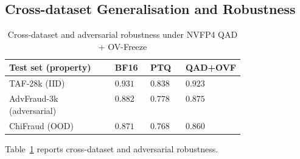 \documentclass[final,5p,times,number]{elsarticle}
\begin{document}
\subsection{Cross-dataset Generalisation and Robustness}\label{sec:crossdata}

\begin{table}[!t]
\centering
\caption{Cross-dataset and adversarial robustness under NVFP4 QAD + OV-Freeze}
\label{tab4-cross-en}
\small
\renewcommand{\arraystretch}{1.15}
\begin{tabular}{l>{\centering\arraybackslash}p{0.15\linewidth}>{\centering\arraybackslash}p{0.15\linewidth}>{\centering\arraybackslash}p{0.15\linewidth}}
\toprule
\textbf{Test set (property)} & \textbf{BF16} & \textbf{PTQ} & \textbf{QAD+OVF} \\
\midrule
TAF-28k (IID) & $0.931$ & $0.838$ & $\mathbf{0.923}$ \\
AdvFraud-3k (adversarial) & $0.882$ & $0.778$ & $\mathbf{0.875}$ \\
ChiFraud (OOD) & $0.871$ & $0.768$ & $\mathbf{0.860}$ \\
\bottomrule
\end{tabular}
\end{table}

Table~\ref{tab4-cross-en} reports cross-dataset and adversarial robustness.
\end{document}
